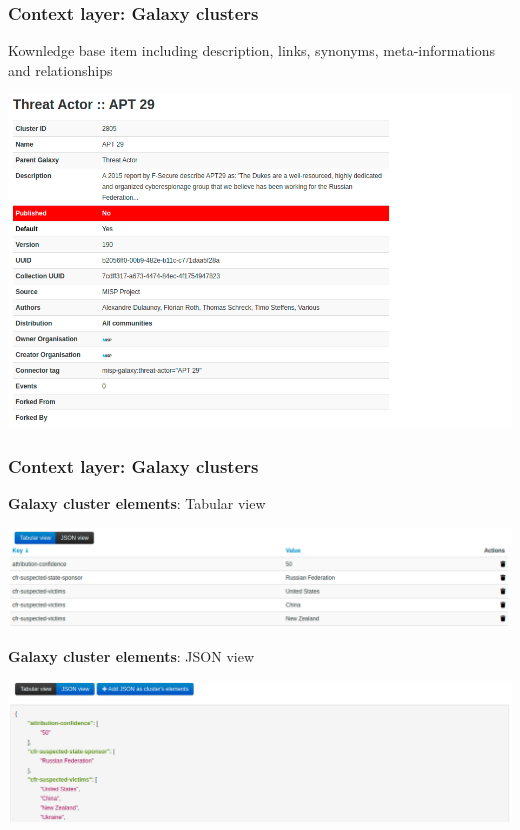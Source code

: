 \begin{frame}
    \frametitle{Context layer: Galaxy clusters}
    Kownledge base item including description, links, synonyms, meta-informations and relationships
    \begin{center}
        \includegraphics[width=0.9\linewidth]{screenshots/cluster-view.png}
    \end{center}
\end{frame}
\begin{frame}
    \frametitle{Context layer: Galaxy clusters}
    {\bf Galaxy cluster elements}: Tabular view
    \begin{center}
        \includegraphics[width=1.0\linewidth]{screenshots/cluster-elements-tab.png}
    \end{center}
    \vspace{1em}
    {\bf Galaxy cluster elements}: JSON view
    \begin{center}
        \includegraphics[width=1.0\linewidth]{screenshots/cluster-elements-json.png}
    \end{center}
\end{frame}

